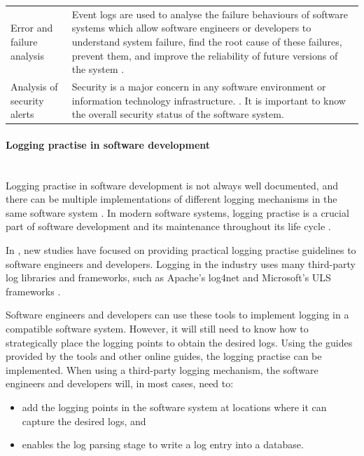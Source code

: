 \begin{xltabular}{\textwidth}{p{4cm}X}
	Error and failure analysis & \RaggedRight Event logs are used to analyse the failure behaviours of software systems which allow software engineers or developers to understand system failure, find the root cause of these failures, prevent them, and improve the reliability of future versions of the system \cite{Cinque2013}.\\


	\RaggedRight Analysis of security alerts & \RaggedRight Security is a major concern in any software environment or information technology infrastructure. \cite{Pathan2014, Dwyer2013}. It is important to know the overall security status of the software system. \\
	\bottomrule
\end{xltabular}

\paragraph{Logging practise in software development}\label{sec:ch1_loggingPractice}\leavevmode\\
Logging practise in software development is not always well documented, and there can be multiple implementations of different logging mechanisms in the same software system \cite{Pecchia2015, Kitchenham2007}. In modern software systems, logging practise is a crucial part of software development and its maintenance throughout its life cycle \cite{Rong2018}.\par In , new studies have focused on providing practical logging practise guidelines to software engineers and developers. Logging in the industry uses many third-party log libraries and frameworks, such as Apache's log4net and Microsoft's ULS frameworks \cite{Zhu2015, Rong2018}.\par Software engineers and developers can use these tools to implement logging in a compatible software system. However, it will still need to know how to strategically place the logging points to obtain the desired logs. Using the guides provided by the tools and other online guides, the logging practise can be implemented. When using a third-party logging mechanism, the software engineers and developers will, in most cases, need to:

\begin{itemize}
	\item add the logging points in the software system at locations where it can capture the desired logs, and
	\item enables the log parsing stage to write a log entry into a database.
\end{itemize}

